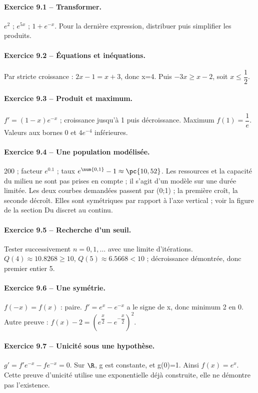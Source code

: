\paragraph{Exercice 9.1 -- Transformer.} $e^2$ ; $e^{5x}$ ; $1+e^{-x}$. Pour la dernière expression, distribuer puis simplifier les produits.
\paragraph{Exercice 9.2 -- Équations et inéquations.} Par stricte croissance : $2x-1=x+3$, donc x=4. Puis $-3x\geq x-2$, soit $x\leq \dfrac{1}{2}$.
\paragraph{Exercice 9.3 -- Produit et maximum.} $f\prime=(1-x)e^{-x}$ ; croissance jusqu’à 1 puis décroissance. Maximum $f(1)=\dfrac{1}{e}$. Valeurs aux bornes 0 et $4e^{-4}$ inférieures.
\paragraph{Exercice 9.4 -- Une population modélisée.} 200 ; facteur $e^{\num{0,1}}$ ; taux $e^{\num{0,1}}-1\approx\pc{10,52}$. Les ressources et la capacité du milieu ne sont pas prises en compte ; il s’agit d’un modèle sur une durée limitée. Les deux courbes demandées passent par (0;1) ; la première croît, la seconde décroît. Elles sont symétriques par rapport à l’axe vertical ; voir la figure de la section Du discret au continu.
\paragraph{Exercice 9.5 -- Recherche d’un seuil.} Tester successivement $n=0,1,\ldots$ avec une limite d’itérations. $Q(4)\approx\num{10,8268}\geq10$, $Q(5)\approx\num{6,5668}<10$ ; décroissance démontrée, donc premier entier 5.
\paragraph{Exercice 9.6 -- Une symétrie.} $f(-x)=f(x)$ : paire. $f\prime=e^x-e^{-x}$ a le signe de x, donc minimum 2 en 0. Autre preuve : $f(x)-2=(e^{\dfrac{x}{2}}-e^{-\dfrac{x}{2}})^2$.
\paragraph{Exercice 9.7 -- Unicité sous une hypothèse.} $g\prime=f\prime e^{-x}-fe^{-x}=0$. Sur $\R$, g est constante, et g(0)=1. Ainsi $f(x)=e^x$. Cette preuve d’unicité utilise une exponentielle déjà construite, elle ne démontre pas l’existence.
